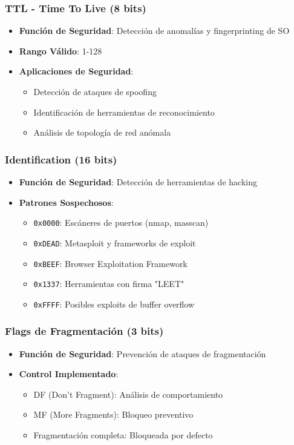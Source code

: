 \documentclass[12pt,a4paper]{article}
\begin{document}
\subsubsection{TTL - Time To Live (8 bits)}
\begin{itemize}
    \item \textbf{Función de Seguridad}: Detección de anomalías y fingerprinting de SO
    \item \textbf{Rango Válido}: 1-128
    \item \textbf{Aplicaciones de Seguridad}:
    \begin{itemize}
        \item Detección de ataques de spoofing
        \item Identificación de herramientas de reconocimiento
        \item Análisis de topología de red anómala
    \end{itemize}
\end{itemize}

\subsubsection{Identification (16 bits)}
\begin{itemize}
    \item \textbf{Función de Seguridad}: Detección de herramientas de hacking
    \item \textbf{Patrones Sospechosos}:
    \begin{itemize}
        \item \texttt{0x0000}: Escáneres de puertos (nmap, masscan)
        \item \texttt{0xDEAD}: Metasploit y frameworks de exploit
        \item \texttt{0xBEEF}: Browser Exploitation Framework
        \item \texttt{0x1337}: Herramientas con firma "LEET"
        \item \texttt{0xFFFF}: Posibles exploits de buffer overflow
    \end{itemize}
\end{itemize}

\subsubsection{Flags de Fragmentación (3 bits)}
\begin{itemize}
    \item \textbf{Función de Seguridad}: Prevención de ataques de fragmentación
    \item \textbf{Control Implementado}:
    \begin{itemize}
        \item DF (Don't Fragment): Análisis de comportamiento
        \item MF (More Fragments): Bloqueo preventivo
        \item Fragmentación completa: Bloqueada por defecto
    \end{itemize}
\end{itemize}
\end{document}
